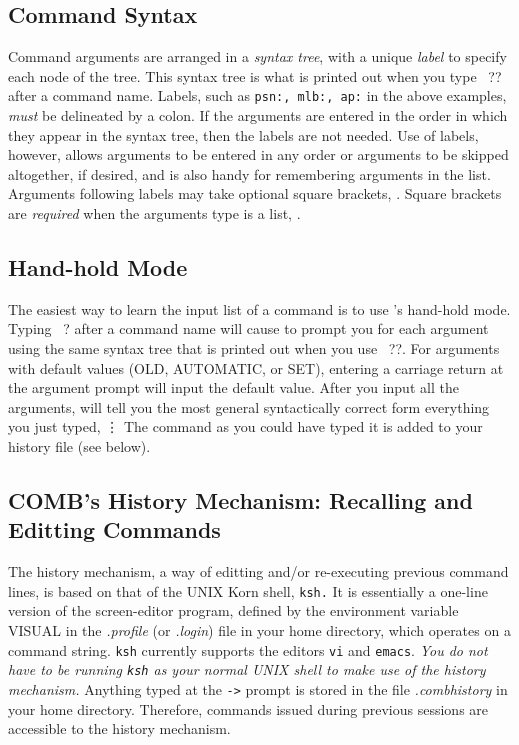 \subsection{Command Syntax}
Command arguments are
arranged in a {\it syntax tree}, with a unique {\it label\/} to 
specify each node of the tree.  This syntax tree is what is printed out 
when you type {\us\ ??} after a command name.  Labels, such as 
{\tt psn:, mlb:, ap:} in the above 
examples, {\it must\/} be delineated by a colon. If the arguments are entered 
in the order in which they appear in the syntax tree, then the labels are
not needed. Use of labels, however, allows arguments to be entered in any 
order or arguments to be skipped altogether, if desired, and is also handy 
for remembering arguments in the list. Arguments following labels may
take optional square brackets, . Square
brackets are {\em required\/} when the arguments type is a list, 
.

\subsection{Hand-hold Mode}
The easiest way to learn the input list of a command is to use
\C's hand-hold mode. Typing {\us\ ?} after a command name will cause
\COMB to prompt you for each argument using the same syntax tree
that is printed out when you use {\us\ ??}. For arguments with
default values (OLD, AUTOMATIC, or SET), entering a carriage return at
the argument prompt will input the default value.
After you input all the arguments, \COMB will
tell you the most general syntactically correct form everything
you just typed, \eg
{}
\vdots
\smallskip
\noindent The command as you could have typed it is added to your history file 
(see below).

\subsection{COMB's History Mechanism: Recalling and Editting Commands} 

The \COMB history mechanism, a way of editting and/or re-executing previous 
command
lines, is based on that of the UNIX Korn shell, {\tt ksh.}
It is essentially a one-line version of the screen-editor program, defined
by the environment variable VISUAL in the {\sl .profile\/} (or {\sl .login\/})
file in your home directory, which operates on a command string.
{\tt ksh} currently supports the editors {\tt vi} and {\tt emacs}.
{\it You do not have to be running\/ {\tt ksh} as your normal UNIX shell
to make use of the \COMB history mechanism.}
Anything typed at the {\tt ->} prompt is stored in the file {\sl .combhistory\/} in
your home directory. Therefore, commands issued during previous \COMB sessions  
are accessible to the history mechanism.
 
